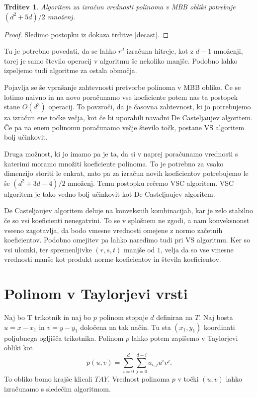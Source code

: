 \documentclass{article}
\newtheorem{trditev}{Trditev}[section]
\begin{document}
\begin{trditev}
Algoritem za izračun vrednosti polinoma v MBB obliki potrebuje $(d^2+5d)/2$ množenj.
\end{trditev}
\begin{proof}
Sledimo postopku iz dokaza trditve \ref{decast}.
\end{proof}
Tu je potrebno povedati, da se lahko $r^d$ izračuna hitreje, kot z $d-1$ množenji, torej je samo število operacij v algoritmu še nekoliko manjše. Podobno lahko izpeljemo tudi algoritme za ostala območja.


\vspace{3mm}

Pojavlja se še vprašanje zahtevnosti pretvorbe polinoma v MBB obliko. Če se lotimo naivno in na novo poračunamo vse koeficiente potem nas ta postopek stane $O(d^3)$ operacij. To povzroči, da je časovna zahtevnost, ki jo potrebujemo za izračun ene točke večja, kot če bi uporabili navadni De Casteljaujev algoritem. Če pa na enem polinomu poračunamo večje število točk, postane VS algoritem bolj učinkovit.

Druga možnost, ki jo imamo pa je ta, da si v naprej poračunamo vrednosti s katerimi moramo množiti koeficiente polinoma. To je potrebno za vsako dimenzijo storiti le enkrat, nato pa za izračun novih koeficientov potrebujemo le še $(d^2+3d-4)/2$ množenj. Temu postopku rečemo VSC algoritem. VSC algoritem je tako vedno bolj učinkovit kot De Casteljaujev algoritem.

De Casteljaujev algoritem deluje na konveksnih kombinacijah, kar je zelo stabilno če so vsi koeficienti nenegatvini. To se v splošnem ne zgodi, a nam konveksnonst vseeno zagotavlja, da bodo vmesne vrednosti omejene z normo začetnih koeficientov. Podobno omejitev pa lahko naredimo tudi pri VS algoritmu. Ker so vsi ulomki, ter spremenljivke $(r,s,t)$ manjše od $1$, velja da so vse vmesne vrednosti manše kot produkt norme koeficientov in števila koeficientov.

\section{Polinom v Taylorjevi vrsti}

Naj bo T trikotnik in naj bo $p$ polinom stopnje $d$ definiran na $T$. Naj bosta $u = x-x_1$ in $v = y-y_1$ določena na tak način. Tu sta $(x_1,y_1)$ koordinati poljubnega ogljišča trikotnika. Polinom $p$ lahko potem zapišemo v Taylorjevi obliki kot 
$$p(u,v) = \sum_{i = 0}^d{\sum_{j=0}^{d-i}{a_{i,j}u^iv^j }}.$$To obliko bomo krajše klicali $TAY$.  Vrednost polinoma $p$ v točki $(u,v)$ lahko izračunamo s sledečim algoritmom.
\end{document}
